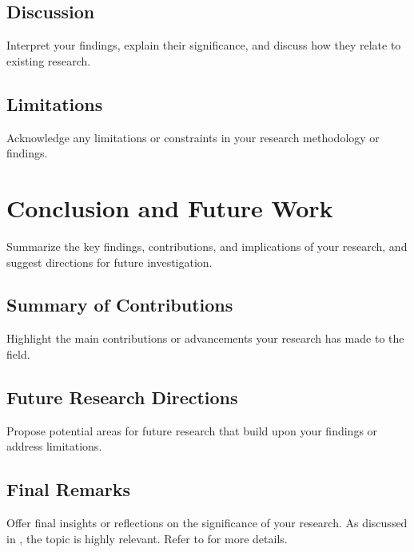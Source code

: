 \section{Discussion}
Interpret your findings, explain their significance, and discuss how they relate to existing research.

\section{Limitations}
Acknowledge any limitations or constraints in your research methodology or findings.

\chapter{Conclusion and Future Work}
Summarize the key findings, contributions, and implications of your research, and suggest directions for future investigation.

\section{Summary of Contributions}
Highlight the main contributions or advancements your research has made to the field.

\section{Future Research Directions}
Propose potential areas for future research that build upon your findings or address limitations.

\section{Final Remarks}
Offer final insights or reflections on the significance of your research.
As discussed in \cite{Sample2023}, the topic is highly relevant. Refer to \cite{Book2022} for more details.
